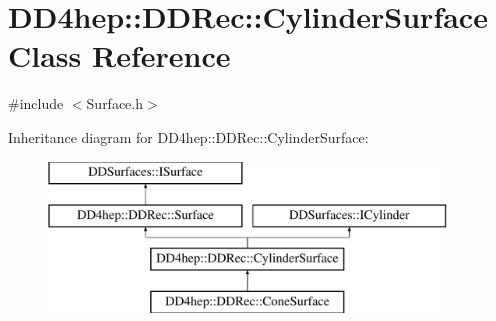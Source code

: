 \hypertarget{class_d_d4hep_1_1_d_d_rec_1_1_cylinder_surface}{}\section{D\+D4hep\+:\+:D\+D\+Rec\+:\+:Cylinder\+Surface Class Reference}
\label{class_d_d4hep_1_1_d_d_rec_1_1_cylinder_surface}


{\ttfamily \#include $<$Surface.\+h$>$}

Inheritance diagram for D\+D4hep\+:\+:D\+D\+Rec\+:\+:Cylinder\+Surface\+:\begin{figure}[H]
\begin{center}
\leavevmode
\includegraphics[height=4.000000cm]{class_d_d4hep_1_1_d_d_rec_1_1_cylinder_surface}
\end{center}
\end{figure}
